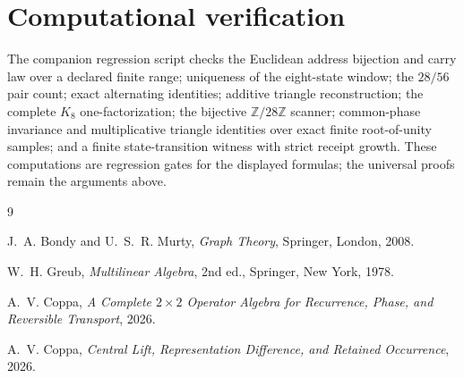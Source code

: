 \documentclass[11pt,letterpaper]{article}
\theoremstyle{relationstyle}
\newcommand{\Z}{\mathbb{Z}}
\begin{document}
\section{Computational verification}

The companion regression script checks the Euclidean address bijection and carry law over a declared finite range; uniqueness of the eight-state window; the $28/56$ pair count; exact alternating identities; additive triangle reconstruction; the complete $K_8$ one-factorization; the bijective $\Z/28\Z$ scanner; common-phase invariance and multiplicative triangle identities over exact finite root-of-unity samples; and a finite state-transition witness with strict receipt growth.  These computations are regression gates for the displayed formulas; the universal proofs remain the arguments above.

\begin{thebibliography}{9}
\small

J.~A. Bondy and U.~S.~R. Murty,
\emph{Graph Theory},
Springer, London, 2008.

W.~H. Greub,
\emph{Multilinear Algebra},
2nd ed., Springer, New York, 1978.

A.~V. Coppa,
\emph{A Complete $2\times2$ Operator Algebra for Recurrence, Phase, and Reversible Transport},
2026.

A.~V. Coppa,
\emph{Central Lift, Representation Difference, and Retained Occurrence},
2026.

\end{thebibliography}
\end{document}
